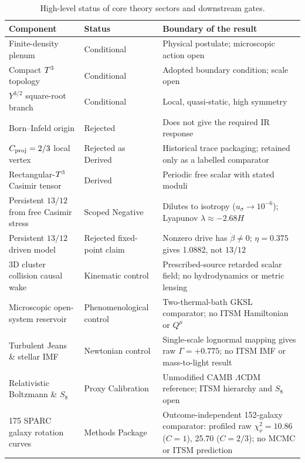 \begin{table}[ht]
\centering
\small
\caption{High-level status of core theory sectors and downstream gates.}
\begin{tabular}{@{}p{}@{\hspace{0.8em}}p{}@{\hspace{0.8em}}p{}@{}}
\toprule
Component & Status & Boundary of the result \\
\midrule
Finite-density plenum & Conditional & Physical postulate; microscopic action open \\
Compact $T^3$ topology & Conditional & Adopted boundary condition; scale open \\
$Y^{3/2}$ square-root branch & Conditional & Local, quasi-static, high symmetry \\
Born--Infeld origin & Rejected & Does not give the required IR response \\
$C_{\mathrm{proj}}=2/3$ local vertex & Rejected as Derived & Historical trace packaging; retained only as a labelled comparator \\
Rectangular-$T^3$ Casimir tensor & Derived & Periodic free scalar with stated moduli \\
Persistent $13/12$ from free Casimir stress & Scoped Negative & Dilutes to isotropy ($u_\sigma \to 10^{-6}$); Lyapunov $\lambda \approx -2.68H$ \\
Persistent $13/12$ driven model & Rejected fixed-point claim & Nonzero drive has $\dot\beta\ne0$; $\eta=0.375$ gives 1.0882, not $13/12$ \\
3D cluster collision causal wake & Kinematic control & Prescribed-source retarded scalar field; no hydrodynamics or metric lensing \\
Microscopic open-system reservoir & Phenomenological control & Two-thermal-bath GKSL comparator; no ITSM Hamiltonian or $Q^\mu$ \\
Turbulent Jeans \& stellar IMF & Newtonian control & Single-scale lognormal mapping gives raw $\Gamma=+0.775$; no ITSM IMF or mass-to-light result \\
Relativistic Boltzmann \& $S_8$ & Proxy Calibration & Unmodified CAMB $\Lambda\mathrm{CDM}$ reference; ITSM hierarchy and $S_8$ open \\
175 SPARC galaxy rotation curves & Methods Package & Outcome-independent 152-galaxy comparator: profiled raw $\chi_\nu^2=10.86$ ($C=1$), 25.70 ($C=2/3$); no MCMC or ITSM prediction \\
\bottomrule
\end{tabular}
\end{table}

